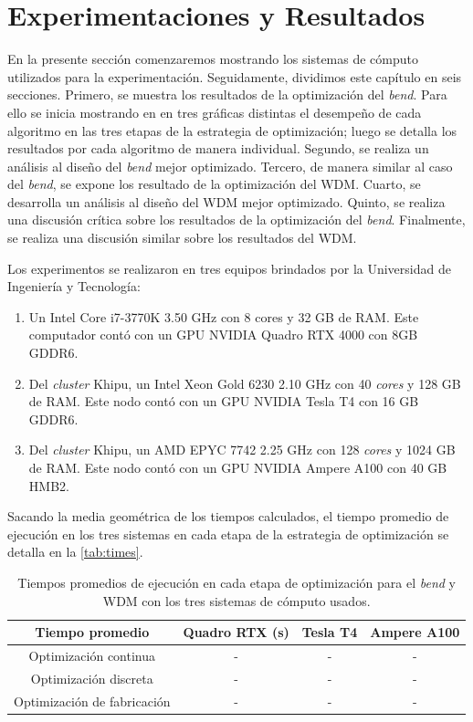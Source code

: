 \chapter{Experimentaciones y Resultados}

En la presente sección comenzaremos mostrando los sistemas de cómputo utilizados para la experimentación.
Seguidamente, dividimos este capítulo en seis secciones.
Primero, se muestra los resultados de la optimización del \emph{bend}.
Para ello se inicia mostrando en en tres gráficas distintas el desempeño de cada algoritmo en 
las tres etapas de la estrategia de optimización; luego se detalla los resultados por cada algoritmo
de manera individual.
Segundo, se realiza un análisis al diseño del \emph{bend} mejor optimizado.
Tercero, de manera similar al caso del \emph{bend}, se expone los resultado de la optimización del WDM.
Cuarto, se desarrolla un análisis al diseño del WDM mejor optimizado.
Quinto, se realiza una discusión crítica sobre los resultados de la optimización del \emph{bend}.
Finalmente, se realiza una discusión similar sobre los resultados del WDM.

Los experimentos se realizaron en tres equipos brindados por la Universidad de Ingeniería y Tecnología:

\begin{enumerate}
  \item Un Intel Core i7-3770K 3.50 GHz con 8 cores y 32 GB de RAM.
        Este computador contó con un GPU NVIDIA Quadro RTX 4000 con 8GB GDDR6.

  \item Del \emph{cluster} Khipu, un Intel Xeon Gold 6230 2.10 GHz con 40 \emph{cores} y 128 GB de RAM.
        Este nodo contó con un GPU NVIDIA Tesla T4 con 16 GB GDDR6.

  \item Del \emph{cluster} Khipu, un AMD EPYC 7742 2.25 GHz con 128 \emph{cores} y 1024 GB de RAM.
        Este nodo contó con un GPU NVIDIA Ampere A100 con 40 GB HMB2.

\end{enumerate}

Sacando la media geométrica de los tiempos calculados, el tiempo promedio de ejecución en los tres 
sistemas en cada etapa de la estrategia de optimización se detalla en la \autoref{tab:times}.

\begin{table}[ht]
    \centering
    \begin{tabular}{|c|c|c|c|}
    \hline 
      Tiempo promedio &  Quadro RTX (s) & Tesla T4 & Ampere A100 \\
    \hline 
      Optimización continua       & - & - & - \\
      Optimización discreta       & - & - & - \\
      Optimización de fabricación & - & - & - \\
    \hline 
    \end{tabular}
    \caption{Tiempos promedios de ejecución en cada etapa de optimización para el \emph{bend} y WDM con los
    tres sistemas de cómputo usados.}
    \label{tab:times}
\end{table}

